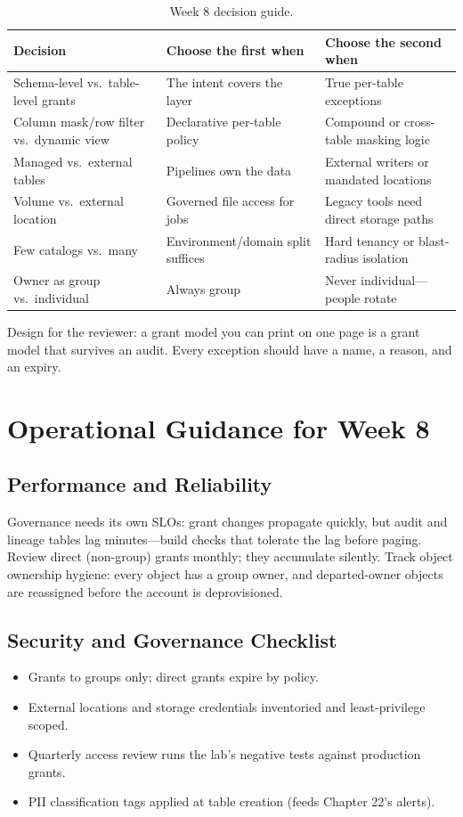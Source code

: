 \begin{table}[H]
\centering
\small
\begin{tabular}{@{}p{3.4cm}p{4.4cm}p{4.6cm}@{}}
\toprule
\textbf{Decision} & \textbf{Choose the first when} & \textbf{Choose the second when} \\
\midrule
Schema-level vs.\ table-level grants & The intent covers the layer & True per-table exceptions \\
Column mask/row filter vs.\ dynamic view & Declarative per-table policy & Compound or cross-table masking logic \\
Managed vs.\ external tables & Pipelines own the data & External writers or mandated locations \\
Volume vs.\ external location & Governed file access for jobs & Legacy tools need direct storage paths \\
Few catalogs vs.\ many & Environment/domain split suffices & Hard tenancy or blast-radius isolation \\
Owner as group vs.\ individual & Always group & Never individual---people rotate \\
\bottomrule
\end{tabular}
\caption{Week 8 decision guide.}
\label{tab:ch8-decisions}
\end{table}

Design for the reviewer: a grant model you can print on one page is a grant model that survives an audit. Every exception should have a name, a reason, and an expiry.

\section{Operational Guidance for Week 8}
%
\subsection{Performance and Reliability}
Governance needs its own SLOs: grant changes propagate quickly, but audit and lineage tables lag minutes---build checks that tolerate the lag before paging. Review direct (non-group) grants monthly; they accumulate silently. Track object ownership hygiene: every object has a group owner, and departed-owner objects are reassigned before the account is deprovisioned.

\subsection{Security and Governance Checklist}
\begin{itemize}
    \item Grants to groups only; direct grants expire by policy.
    \item External locations and storage credentials inventoried and least-privilege scoped.
    \item Quarterly access review runs the lab's negative tests against production grants.
    \item PII classification tags applied at table creation (feeds Chapter 22's alerts).
\end{itemize}

